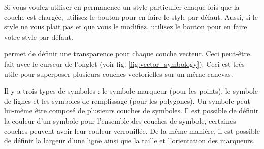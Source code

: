 Si vous voulez utiliser en permanence un style particulier chaque fois que la couche est chargée, utilisez le bouton  pour en faire le style par défaut. Aussi, si le style ne vous plait pas et que vous le modifiez, utilisez le bouton  pour en faire votre style par défaut.

 \label{sec:vect_transparency} 

\qg permet de définir une transparence pour chaque couche vecteur. Ceci peut-être fait avec le curseur  de l'onglet  (voir fig. \ref{fig:vector_symbology}). Ceci est très utile pour superposer plusieurs couches vectorielles sur un même canevas.


Il y a trois types de symboles : le symbole marqueur (pour les points), le symbole de lignes et les symboles de remplissage (pour les polygones). Un symbole peut lui-même être composé de plusieurs couches de symboles. Il est possible de définir la couleur d'un symbole pour l'ensemble des couches de symbole, certaines couches peuvent avoir leur couleur verrouillée. De la même manière, il est possible de définir la largeur d'une ligne ainsi que la taille et l'orientation des marqueurs.

